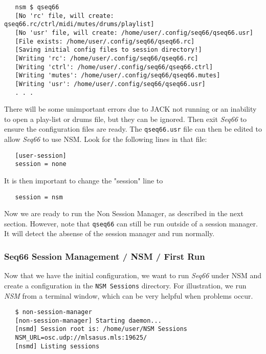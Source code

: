 \begin{verbatim}
   nsm $ qseq66 
   [No 'rc' file, will create: qseq66.rc/ctrl/midi/mutes/drums/playlist]
   [No 'usr' file, will create: /home/user/.config/seq66/qseq66.usr]
   [File exists: /home/user/.config/seq66/qseq66.rc]
   [Saving initial config files to session directory!]
   [Writing 'rc': /home/user/.config/seq66/qseq66.rc]
   [Writing 'ctrl': /home/user/.config/seq66/qseq66.ctrl]
   [Writing 'mutes': /home/user/.config/seq66/qseq66.mutes]
   [Writing 'usr': /home/user/.config/seq66/qseq66.usr]
   . . .
\end{verbatim}

   There will be some unimportant errors due to JACK not running or an
   inability to open a play-list or drums file, but they can be ignored.
   Then exit \textsl{Seq66} to ensure the configuration files are ready.
   The \texttt{qseq66.usr} file can then be edited to allow \textsl{Seq66} to
   use NSM.  Look for the following lines in that file:

\begin{verbatim}
   [user-session]
   session = none
\end{verbatim}

   It is then important to change the "session" line to

\begin{verbatim}
   session = nsm
\end{verbatim}

   Now we are ready to run the Non Session Manager, as described in the next
   section.  However, note that \texttt{qseq66} can still be run outside of a
   session manager.  It will detect the absense of the session manager and run
   normally.

\subsubsection{Seq66 Session Management / NSM / First Run}
\label{subsec:sessions_nsm}

   Now that we have the initial configuration, we want to run \textsl{Seq66}
   under NSM and create a configuration in the \texttt{NSM Sessions} directory.
   For illustration, we run \textsl{NSM} from a terminal window, which can be
   very helpful when problems occur.

\begin{verbatim}
   $ non-session-manager
   [non-session-manager] Starting daemon...
   [nsmd] Session root is: /home/user/NSM Sessions
   NSM_URL=osc.udp://mlsasus.mls:19625/
   [nsmd] Listing sessions
\end{verbatim}

